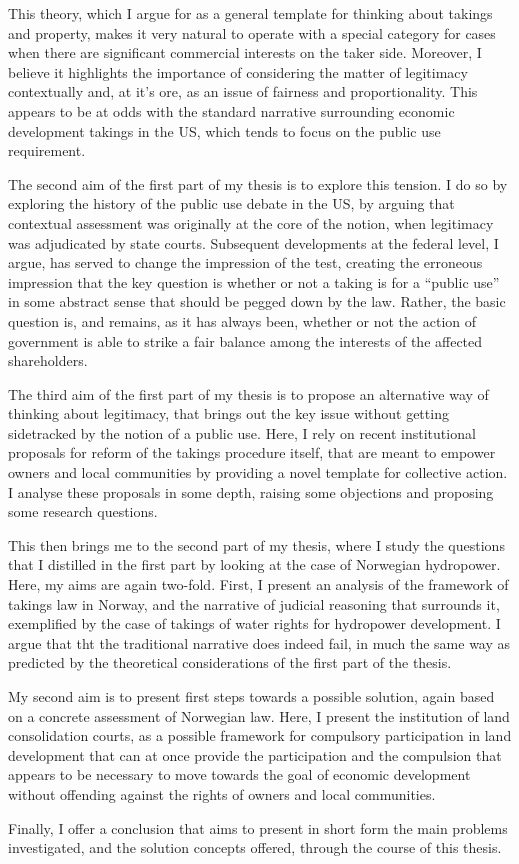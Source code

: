 This theory, which I argue for as a general template for thinking about takings and property, makes it very natural to operate with a special category for cases when there are significant commercial interests on the taker side. Moreover, I believe it highlights the importance of considering the matter of legitimacy contextually and, at it's ore, as an issue of fairness and proportionality. This appears to be at odds with the standard narrative surrounding economic development takings in the US, which tends to focus on the public use requirement.

The second aim of the first part of my thesis is to explore this tension. I do so by exploring the history of the public use debate in the US, by arguing that contextual assessment was originally at the core of the notion, when legitimacy was adjudicated by state courts. Subsequent developments at the federal level, I argue, has served to change the impression of the test, creating the erroneous impression that the key question is whether or not a taking is for a ``public use'' in some abstract sense that should be pegged down by the law. Rather, the basic question is, and remains, as it has always been, whether or not the action of government is able to strike a fair balance among the interests of the affected shareholders.

The third aim of the first part of my thesis is to propose an alternative way of thinking about legitimacy, that brings out the key issue without getting sidetracked by the notion of a public use. Here, I rely on recent institutional proposals for reform of the takings procedure itself, that are meant to empower owners and local communities by providing a novel template for collective action. I analyse these proposals in some depth, raising some objections and proposing some research questions.

This then brings me to the second part of my thesis, where I study the questions that I distilled in the first part by looking at the case of Norwegian hydropower. Here, my aims are again two-fold. First, I present an analysis of the framework of takings law in Norway, and the narrative of judicial reasoning that surrounds it, exemplified by the case of takings of water rights for hydropower development. I argue that tht the traditional narrative does indeed fail, in much the same way as predicted by the theoretical considerations of the first part of the thesis. 

My second aim is to present first steps towards a possible solution, again based on a concrete assessment of Norwegian law. Here, I present the institution of land consolidation courts, as a possible framework for compulsory participation in land development that can at once provide the participation and the compulsion that appears to be necessary to move towards the goal of economic development without offending against the rights of owners and local communities.

Finally, I offer a conclusion that aims to present in short form the main problems investigated, and the solution concepts offered, through the course of this thesis.

